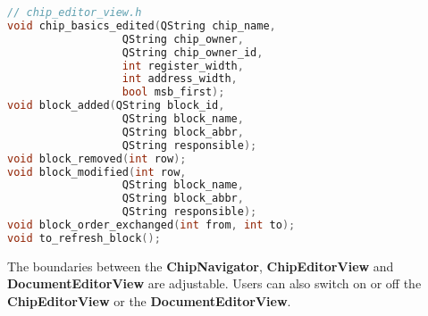 \begin{lstlisting}[language=C++, caption={Signals for Updating the Chip Navigator\label{lst:Signals for Updating the Chip Navigator}}]
// chip_editor_view.h
void chip_basics_edited(QString chip_name, 
                  QString chip_owner, 
                  QString chip_owner_id, 
                  int register_width, 
                  int address_width, 
                  bool msb_first);
void block_added(QString block_id, 
                  QString block_name, 
                  QString block_abbr, 
                  QString responsible);
void block_removed(int row);
void block_modified(int row, 
                  QString block_name, 
                  QString block_abbr, 
                  QString responsible);
void block_order_exchanged(int from, int to);
void to_refresh_block(); 
\end{lstlisting}

The boundaries between the \textbf{ChipNavigator}, \textbf{ChipEditorView} and \textbf{DocumentEditorView} are adjustable. Users can also switch on or off the \textbf{ChipEditorView} or the \textbf{DocumentEditorView}. 

